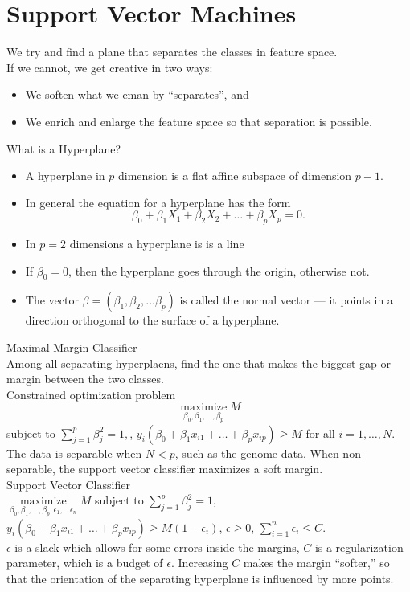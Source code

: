 \documentclass[11pt, a4paper]{article}
\begin{document}
\section{Support Vector Machines}
We try and find a plane that separates the classes in feature space.\\
If we cannot, we get creative in two ways:
\begin{itemize}
\item We soften what we eman by ``separates'', and 
\item We enrich and enlarge the feature space so that separation is possible.
\end{itemize}
What is a Hyperplane?
\begin{itemize}
  \item A hyperplane in $p$ dimension is a flat affine subspace of dimension $p-1$.
\item In general the equation for a hyperplane has the form
  \[
  \beta_0+\beta_1X_1+\beta_2X_2+\dots+\beta_pX_p=0.
  \]
\item In $p=2$ dimensions a hyperplane is is a line
\item If $\beta_0=0$, then the hyperplane goes through the origin, otherwise not.
\item The vector $\beta=(\beta_1,\beta_2,\dots\beta_p)$ is called the normal vector --- it points in a direction orthogonal to the surface of a hyperplane.
\end{itemize}
Maximal Margin Classifier\\
Among all separating hyperplaens, find the one that makes the biggest gap or margin between the two classes.\\
Constrained optimization problem
\[
  \underset{\beta_0,\beta_1,\dots,\beta_p}{\operatorname{maximize}} M
\]
subject to $\sum_{j=1}^p \beta_j^2 = 1,$, $y_i(\beta_0+\beta_1x_{i1}+\dots+\beta_px_{ip})\geq M$  for all $i=1,\dots,N$.
The data is separable when $N<p$, such as the genome data. When non-separable, the support vector classifier maximizes a soft margin.\\[1mm]
Support Vector Classifier\\
$\underset{\beta_0,\beta_1,\dots,\beta_p,\epsilon_1,\dots\epsilon_n}{\operatorname{maximize}} M$ subject to $\sum_{j=1}^p \beta_j^2=1$,  $y_i(\beta_0+\beta_1x_{i1}+\dots+\beta_px_{ip})\geq M(1-\epsilon_i)$, $\epsilon\geq 0$, $\sum_{i=1}^n \epsilon_i \leq C$.\\
$\epsilon$ is a slack which allows for some errors inside the margins, $C$ is a regularization parameter, which is a budget of $\epsilon$. Increasing $C$ makes the margin ``softer,'' so that the orientation of the separating hyperplane is influenced by more points. \\
\end{document}
